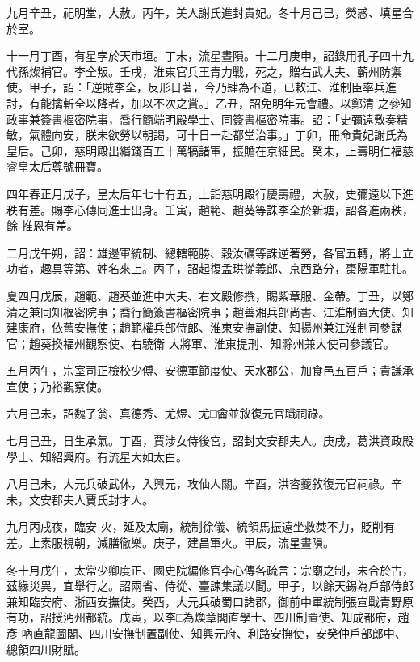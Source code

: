 \begin{pinyinscope}
 九月辛丑，祀明堂，大赦。丙午，美人謝氏進封貴妃。冬十月己巳，熒惑、填星合於室。



 十一月丁酉，有星孛於天市垣。丁未，流星晝隕。十二月庚申，詔錄用孔子四十九代孫燦補官。李全叛。壬戌，淮東官兵王青力戰，死之，贈右武大夫、蘄州防禦使。甲子，詔：「逆賊李全，反形日著，今乃肆為不道，已敕江、淮制臣率兵進討，有能擒斬全以降者，加以不次之賞。」乙丑，詔免明年元會禮。以鄭清
 之參知政事兼簽書樞密院事，喬行簡端明殿學士、同簽書樞密院事。詔：「史彌遠敷奏精敏，氣體向安，朕未欲勞以朝謁，可十日一赴都堂治事。」丁卯，冊命貴妃謝氏為皇后。己卯，慈明殿出緡錢百五十萬犒諸軍，振贍在京細民。癸未，上壽明仁福慈睿皇太后尊號冊寶。



 四年春正月戊子，皇太后年七十有五，上詣慈明殿行慶壽禮，大赦，史彌遠以下進秩有差。賜李心傳同進士出身。壬寅，趙範、趙葵等誅李全於新塘，詔各進兩秩，餘
 推恩有差。



 二月戊午朔，詔：雄邊軍統制、總轄範勝、穀汝礪等誅逆著勞，各官五轉，將士立功者，趣具等第、姓名來上。丙子，詔起復孟珙從義郎、京西路分，棗陽軍駐扎。



 夏四月戊辰，趙範、趙葵並進中大夫、右文殿修撰，賜紫章服、金帶。丁丑，以鄭清之兼同知樞密院事；喬行簡簽書樞密院事；趙善湘兵部尚書、江淮制置大使、知建康府，依舊安撫使；趙範權兵部侍郎、淮東安撫副使、知揚州兼江淮制司參謀官；趙葵換福州觀察使、右驍衛
 大將軍、淮東提刑、知滁州兼大使司參議官。



 五月丙午，宗室司正檢校少傅、安德軍節度使、天水郡公，加食邑五百戶；貴謙承宣使；乃裕觀察使。



 六月己未，詔魏了翁、真德秀、尤煜、尤□龠並敘復元官職祠祿。



 七月己丑，日生承氣。丁酉，賈涉女侍後宮，詔封文安郡夫人。庚戌，葛洪資政殿學士、知紹興府。有流星大如太白。



 八月己未，大元兵破武休，入興元，攻仙人關。辛酉，洪咨夔敘復元官祠祿。辛未，文安郡夫人賈氏封才人。



 九月丙戌夜，臨安
 火，延及太廟，統制徐儀、統領馬振遠坐救焚不力，貶削有差。上素服視朝，減膳徹樂。庚子，建昌軍火。甲辰，流星晝隕。



 冬十月戊午，太常少卿度正、國史院編修官李心傳各疏言：宗廟之制，未合於古，茲緣災異，宜舉行之。詔兩省、侍從、臺諫集議以聞。甲子，以餘天錫為戶部侍郎兼知臨安府、浙西安撫使。癸酉，大元兵破蜀口諸郡，御前中軍統制張宣戰青野原有功，詔授沔州都統。戊寅，以李□為煥章閣直學士、四川制置使、知成都府，趙彥
 吶直龍圖閣、四川安撫制置副使、知興元府、利路安撫使，安癸仲戶部郎中、總領四川財賦。




\end{pinyinscope}
